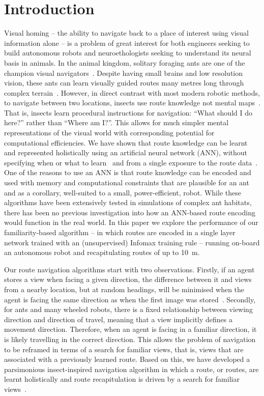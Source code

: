 \documentclass[letterpaper]{article}
\begin{document}
\section{Introduction}
Visual homing -- the ability to navigate back to a place of interest using visual information alone -- is a problem of great interest for both engineers seeking to build autonomous robots and neuroethologists seeking to understand its neural basis in animals.
In the animal kingdom, solitary foraging ants are one of the champion visual navigators~\citep{Wehner2009}.
Despite having small brains and low resolution vision, these ants can learn visually guided routes many metres long through complex terrain~\citep{Knaden2016}.
However, in direct contrast with most modern robotic methods, to navigate between two locations, insects use route knowledge not mental maps~\citep{Wehner2006}. 
That is, insects learn procedural instructions for navigation: ``What should I do here?'' rather than ``Where am I?''. 
This allows for much simpler mental representations of the visual world with corresponding potential for computational efficiencies.
We have shown that route knowledge can be learnt and represented holistically using an artificial neural network (ANN), without specifying when or what to learn~\citep{Baddeley2011} and from a single exposure to the route data~\citep{Baddeley2012}. 
One of the reasons to use an ANN is that route knowledge can be encoded and used with memory and computational constraints that are plausible for an ant and as a corollary, well-suited to a small, power-efficient, robot. 
While these algorithms have been extensively tested in simulations of complex ant habitats, there has been no previous investigation into how an ANN-based route encoding would function in the real world. 
In this paper we explore the performance of our familiarity-based algorithm -- in which routes are encoded in a single layer network trained with an (unsupervised) Infomax training rule -- running on-board an autonomous robot and recapitulating routes of up to \SI{10}{\metre}. 

Our route navigation algorithms start with two observations. 
Firstly, if an agent stores a view when facing a given direction, the difference between it and views from a nearby location, but at random headings, will be minimised when the agent is facing the same direction as when the first image was stored~\citep{Philippides2011,Zeil2003}. 
Secondly, for ants and many wheeled robots, there is a fixed relationship between viewing direction and direction of travel, meaning that a view implicitly defines a movement direction. 
Therefore, when an agent is facing in a familiar direction, it is likely travelling in the correct direction. 
This allows the problem of navigation to be reframed in terms of a search for familiar views, that is, views that are associated with a previously learned route. 
Based on this, we have developed a parsimonious insect-inspired navigation algorithm in which a route, or routes, are learnt holistically and route recapitulation is driven by a search for familiar views~\citep{Baddeley2012}. 
\end{document}
